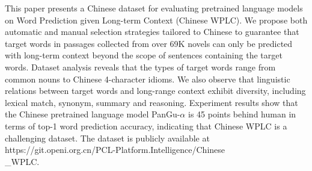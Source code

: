 This paper presents a Chinese dataset for evaluating pretrained language models on Word Prediction given Long-term Context (Chinese WPLC). We propose both automatic and manual selection strategies tailored to Chinese to guarantee that target words in passages collected from over 69K novels can only be predicted with long-term context beyond the scope of sentences containing the target words. Dataset analysis reveals that the types of target words range from common nouns to Chinese 4-character idioms. We also observe that linguistic relations between target words and long-range context exhibit diversity, including lexical match, synonym, summary and reasoning. Experiment results show that the Chinese pretrained language model PanGu-$\alpha$ is 45 points behind human in terms of top-1 word prediction accuracy, indicating that Chinese WPLC is a challenging dataset. The dataset is publicly available at https://git.openi.org.cn/PCL-Platform.Intelligence/Chinese\\_WPLC.
